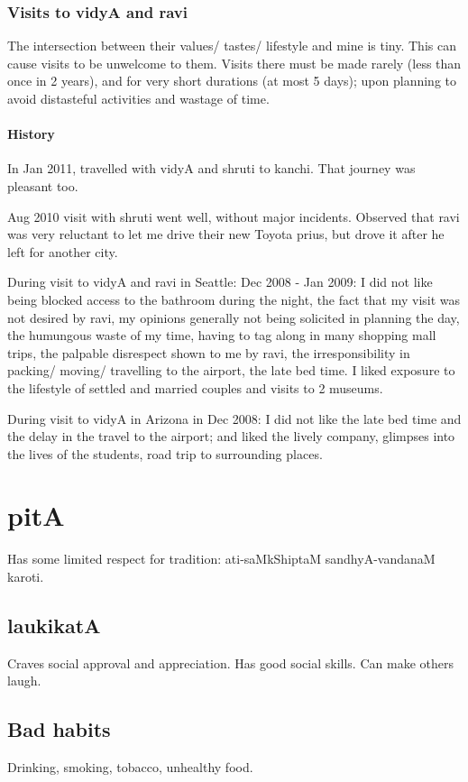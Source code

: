 \documentclass[oneside, article]{memoir}
\begin{document}
\subsection{Visits to vidyA and ravi}
The intersection between their values/ tastes/ lifestyle and mine is tiny. This can cause visits to be unwelcome to them. Visits there must be made rarely (less than once in 2 years), and for very short durations (at most 5 days); upon planning to avoid distasteful activities and wastage of time.

\subsubsection{History}
In Jan 2011, travelled with vidyA and shruti to kanchi. That journey was pleasant too. 

Aug 2010 visit with shruti went well, without major incidents. Observed that ravi was very reluctant to let me drive their new Toyota prius, but drove it after he left for another city.

During visit to vidyA and ravi in Seattle: Dec 2008 - Jan 2009: I did not like being blocked access to the bathroom during the night, the fact that my visit was not desired by ravi, my opinions generally not being solicited in planning the day, the humungous waste of my time, having to tag along in many shopping mall trips, the palpable disrespect shown to me by ravi, the irresponsibility in packing/ moving/ travelling to the airport, the late bed time. I liked exposure to the lifestyle of settled and married couples and visits to 2 museums.

During visit to vidyA in Arizona in Dec 2008: I did not like the late bed time and the delay in the travel to the airport; and liked the lively company, glimpses into the lives of the students, road trip to surrounding places.

\chapter{pitA}
Has some limited respect for tradition: ati-saMkShiptaM sandhyA-vandanaM karoti.

\section{laukikatA}
Craves social approval and appreciation. Has good social skills. Can make others laugh.

\section{Bad habits}
Drinking, smoking, tobacco, unhealthy food.
\end{document}
